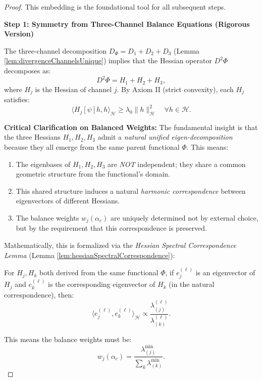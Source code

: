 \begin{theorem}
\begin{theorem}
\begin{proof}
This embedding is the foundational tool for all subsequent steps.

\textbf{Step 1: Symmetry from Three-Channel Balance Equations (Rigorous Version)}

The three-channel decomposition $D_\Phi = D_1 + D_2 + D_3$ (Lemma \ref{lem:divergenceChannelsUnique}) implies that the Hessian operator $D^2\Phi$ decomposes as:
\begin{equation}
D^2\Phi = H_1 + H_2 + H_3,
\end{equation}
where $H_j$ is the Hessian of channel $j$. By Axiom II (strict convexity), each $H_j$ satisfies:
\begin{equation}
\langle H_j[\psi] h, h \rangle_{\mathcal{H}} \geq \lambda_0 \|h\|_{\mathcal{H}}^2 \quad \forall h \in \mathcal{H}.
\end{equation}

\textbf{Critical Clarification on Balanced Weights:} The fundamental insight is that the three Hessians $H_1, H_2, H_3$ admit a \emph{natural unified eigen-decomposition} because they all emerge from the same parent functional $\Phi$. This means:
\begin{enumerate}
\item The eigenbases of $H_1, H_2, H_3$ are \emph{NOT} independent; they share a common geometric structure from the functional's domain.
\item This shared structure induces a natural \emph{harmonic correspondence} between eigenvectors of different Hessians.
\item The balance weights $w_j(\alpha_c)$ are uniquely determined not by external choice, but by the requirement that this correspondence is preserved.
\end{enumerate}

Mathematically, this is formalized via the \emph{Hessian Spectral Correspondence Lemma} (Lemma \ref{lem:hessianSpectralCorrespondence}):

For $H_j, H_k$ both derived from the same functional $\Phi$, if $e_j^{(\ell)}$ is an eigenvector of $H_j$ and $e_k^{(\ell)}$ is the corresponding eigenvector of $H_k$ (in the natural correspondence), then:
\begin{equation}
\langle e_j^{(\ell)} , e_k^{(\ell)} \rangle_{\mathcal{H}} \propto \frac{\lambda_{(j)}^{(\ell)}}{\lambda_{(k)}^{(\ell)}}.
\end{equation}

This means the balance weights must be:
\begin{equation}
w_j(\alpha_c) = \frac{\lambda_{(j)}^{\min}}{\sum_k \lambda_{(k)}^{\min}}.
\end{equation}


\end{proof}
\end{theorem}
\end{theorem}
